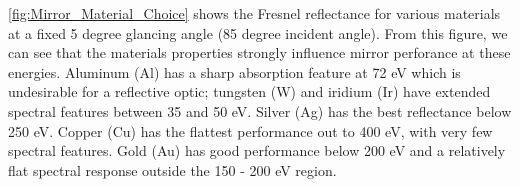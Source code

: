 %
%
%

\cref{fig:Mirror_Material_Choice} shows the Fresnel reflectance for various materials at a fixed 5 degree glancing angle (85 degree incident angle). From this figure, we can see that the materials properties strongly influence mirror perforance at these energies. Aluminum (Al) has a sharp absorption feature at 72 eV which is undesirable for a reflective optic; tungsten (W) and iridium (Ir) have extended spectral features between 35 and 50 eV. Silver (Ag) has the best reflectance below 250 eV. Copper (Cu) has the flattest performance out to 400 eV, with very few spectral features. Gold (Au) has good performance below 200 eV and a relatively flat spectral response outside the 150 - 200 eV region. 

